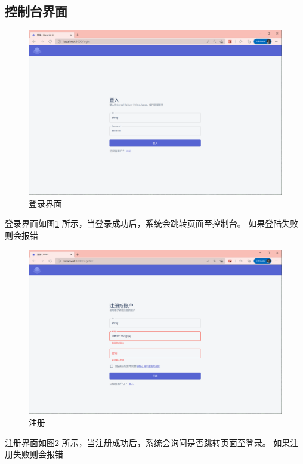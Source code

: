 \subsection{控制台界面}
\begin{figure}[htbp!]
  \centering
  \includegraphics[width=\textwidth]{figures/png/login.png}
  \caption{\label{login}登录界面}
\end{figure}

登录界面如图\ref{login} 所示，当登录成功后，系统会跳转页面至控制台。
如果登陆失败则会报错

\begin{figure}[htbp!]
  \centering
  \includegraphics[width=\textwidth]{figures/png/input_err.png}
  \caption{\label{input_err}注册}
\end{figure}

注册界面如图\ref{input_err} 所示，当注册成功后，系统会询问是否跳转页面至登录。
如果注册失败则会报错

